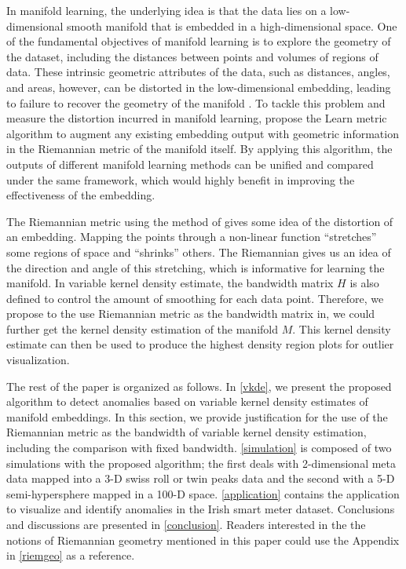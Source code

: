 \documentclass[11pt,a4paper,]{article}
\begin{document}
In manifold learning, the underlying idea is that the data lies on a
low-dimensional smooth manifold that is embedded in a high-dimensional
space. One of the fundamental objectives of manifold learning is to
explore the geometry of the dataset, including the distances between
points and volumes of regions of data. These intrinsic geometric
attributes of the data, such as distances, angles, and areas, however,
can be distorted in the low-dimensional embedding, leading to failure to
recover the geometry of the manifold \autocite{Goldberg2008-co}. To tackle this
problem and measure the distortion incurred in manifold learning,
\textcite{Perrault-Joncas2013-pq} propose the Learn metric algorithm to augment
any existing embedding output with geometric information in the
Riemannian metric of the manifold itself. By applying this algorithm,
the outputs of different manifold learning methods can be unified and
compared under the same framework, which would highly benefit in
improving the effectiveness of the embedding.

The Riemannian metric using the method of \textcite{Perrault-Joncas2013-pq} gives
some idea of the distortion of an embedding. Mapping the points through
a non-linear function ``stretches'' some regions of space and ``shrinks''
others. The Riemannian gives us an idea of the direction and angle of
this stretching, which is informative for learning the manifold. In
variable kernel density estimate, the bandwidth matrix \(H\) is also
defined to control the amount of smoothing for each data point.
Therefore, we propose to the use Riemannian metric as the bandwidth
matrix in, we could further get the kernel density estimation of the
manifold \(M\). This kernel density estimate can then be used to produce
the highest density region plots \autocite{Hyndman1996-lk} for outlier
visualization.

The rest of the paper is organized as follows. In \autoref{vkde}, we
present the proposed algorithm to detect anomalies based on variable
kernel density estimates of manifold embeddings. In this section, we
provide justification for the use of the Riemannian metric as the
bandwidth of variable kernel density estimation, including the
comparison with fixed bandwidth. \autoref{simulation} is composed of two
simulations with the proposed algorithm; the first deals with
2-dimensional meta data mapped into a 3-D swiss roll or twin peaks data
and the second with a 5-D semi-hypersphere mapped in a 100-D space.
\autoref{application} contains the application to visualize and identify
anomalies in the Irish smart meter dataset. Conclusions and discussions
are presented in \autoref{conclusion}. Readers interested in the the
notions of Riemannian geometry mentioned in this paper could use the
Appendix in \autoref{riemgeo} as a reference.
\end{document}
